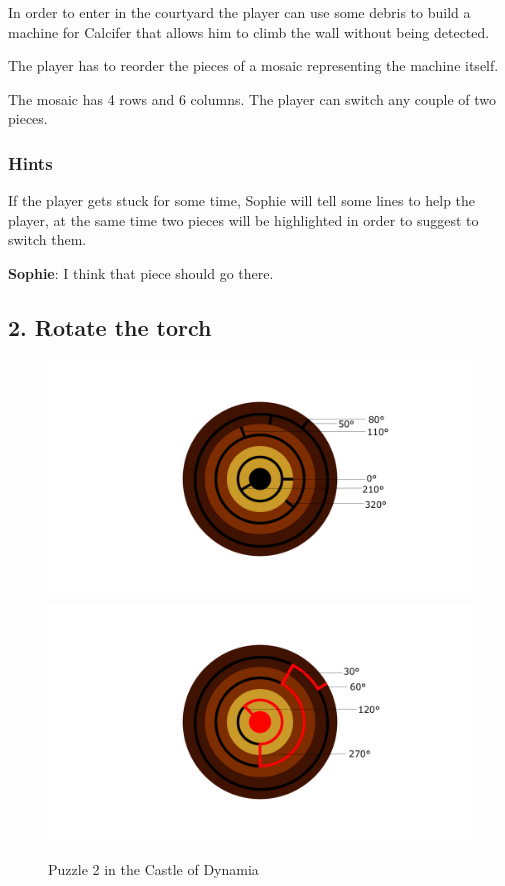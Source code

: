 In order to enter in the courtyard the player can use some debris to build a machine for Calcifer that allows him to climb the wall without being detected.


The player has to reorder the pieces of a mosaic representing the machine itself.

The mosaic has 4 rows and 6 columns. The player can switch any couple of two pieces.

\subsubsection*{Hints}
If the player gets stuck for some time, Sophie will tell some lines to help the player, at the same time two pieces will be highlighted in order to suggest to switch them.

\textbf{Sophie}: I think that piece should go there.

\subsection{2. Rotate the torch}

\begin{figure}[H]
  \centering
  \includegraphics[]{Images/Puzzles/torchPuzzleStart} \quad \includegraphics[]{Images/Puzzles/torchPuzzleSolution}
  \caption{Puzzle 2 in the Castle of Dynamia}
\end{figure}

